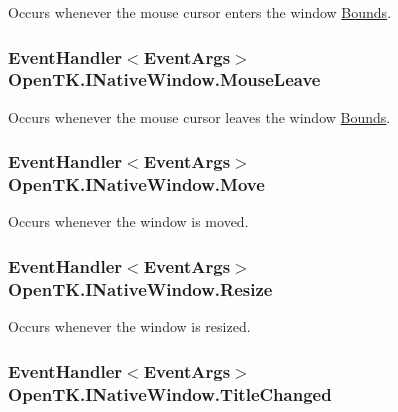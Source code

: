 Occurs whenever the mouse cursor enters the window \hyperlink{interface_open_t_k_1_1_i_native_window_a0cf4d0391cff1166a3f15fbdb1b4d8ab}{Bounds}. 

\hypertarget{interface_open_t_k_1_1_i_native_window_a217050d279f6678319ab32bccba0de40}{
\subsubsection[{Mouse\-Leave}]{\setlength{\rightskip}{0pt plus 5cm}Event\-Handler$<$Event\-Args$>$ Open\-T\-K.\-I\-Native\-Window.\-Mouse\-Leave}}\label{interface_open_t_k_1_1_i_native_window_a217050d279f6678319ab32bccba0de40}


Occurs whenever the mouse cursor leaves the window \hyperlink{interface_open_t_k_1_1_i_native_window_a0cf4d0391cff1166a3f15fbdb1b4d8ab}{Bounds}. 

\hypertarget{interface_open_t_k_1_1_i_native_window_aa2a9b872e56a47dc3f11dcd0078e1ced}{
\subsubsection[{Move}]{\setlength{\rightskip}{0pt plus 5cm}Event\-Handler$<$Event\-Args$>$ Open\-T\-K.\-I\-Native\-Window.\-Move}}\label{interface_open_t_k_1_1_i_native_window_aa2a9b872e56a47dc3f11dcd0078e1ced}


Occurs whenever the window is moved. 

\hypertarget{interface_open_t_k_1_1_i_native_window_afd40870500a57eda076033f4c401ec4c}{
\subsubsection[{Resize}]{\setlength{\rightskip}{0pt plus 5cm}Event\-Handler$<$Event\-Args$>$ Open\-T\-K.\-I\-Native\-Window.\-Resize}}\label{interface_open_t_k_1_1_i_native_window_afd40870500a57eda076033f4c401ec4c}


Occurs whenever the window is resized. 

\hypertarget{interface_open_t_k_1_1_i_native_window_acf92dea76cdae1958f4d899f6ebf2ff4}{
\subsubsection[{Title\-Changed}]{\setlength{\rightskip}{0pt plus 5cm}Event\-Handler$<$Event\-Args$>$ Open\-T\-K.\-I\-Native\-Window.\-Title\-Changed}}\label{interface_open_t_k_1_1_i_native_window_acf92dea76cdae1958f4d899f6ebf2ff4}


